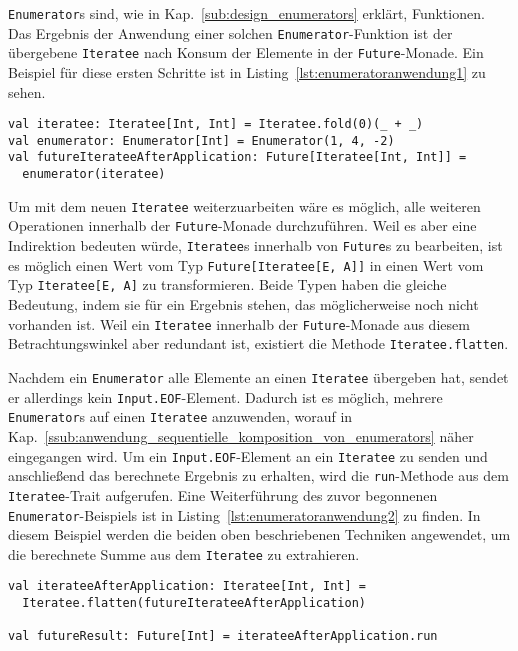 \lstinline|Enumerator|s sind, wie in Kap.~\ref{sub:design_enumerators} erklärt, Funktionen.
Das Ergebnis der Anwendung einer solchen \lstinline|Enumerator|-Funktion ist der übergebene \lstinline|Iteratee| nach Konsum der Elemente in der \lstinline|Future|-Monade.
Ein Beispiel für diese ersten Schritte ist in Listing~\ref{lst:enumeratoranwendung1} zu sehen.

\begin{lstlisting}[caption=Anwendung eines Enumerators auf einen Iteratee, label=lst:enumeratoranwendung1]
val iteratee: Iteratee[Int, Int] = Iteratee.fold(0)(_ + _)
val enumerator: Enumerator[Int] = Enumerator(1, 4, -2)
val futureIterateeAfterApplication: Future[Iteratee[Int, Int]] =
  enumerator(iteratee)
\end{lstlisting}


Um mit dem neuen \lstinline|Iteratee| weiterzuarbeiten wäre es möglich, alle weiteren Operationen innerhalb der \lstinline|Future|-Monade durchzuführen.
Weil es aber eine Indirektion bedeuten würde, \lstinline|Iteratee|s innerhalb von \lstinline|Future|s zu bearbeiten, ist es möglich einen Wert vom Typ \lstinline|Future[Iteratee[E, A]]| in einen Wert vom Typ \lstinline|Iteratee[E, A]| zu transformieren.
Beide Typen haben die gleiche Bedeutung, indem sie für ein Ergebnis stehen, das möglicherweise noch nicht vorhanden ist.
Weil ein \lstinline|Iteratee| innerhalb der \lstinline|Future|-Monade aus diesem Betrachtungswinkel aber redundant ist, existiert die Methode \lstinline|Iteratee.flatten|.


Nachdem ein \lstinline|Enumerator| alle Elemente an einen \lstinline|Iteratee| übergeben hat, sendet er allerdings kein \lstinline|Input.EOF|-Element.
Dadurch ist es möglich, mehrere \lstinline|Enumerator|s auf einen \lstinline|Iteratee| anzuwenden, worauf in Kap.~\ref{ssub:anwendung_sequentielle_komposition_von_enumerators} näher eingegangen wird.
Um ein \lstinline|Input.EOF|-Element an ein \lstinline|Iteratee| zu senden und anschließend das berechnete Ergebnis zu erhalten, wird die \lstinline|run|-Methode aus dem \lstinline|Iteratee|-Trait aufgerufen.
Eine Weiterführung des zuvor begonnenen \lstinline|Enumerator|-Beispiels ist in Listing~\ref{lst:enumeratoranwendung2} zu finden.
In diesem Beispiel werden die beiden oben beschriebenen Techniken angewendet, um die berechnete Summe aus dem \lstinline|Iteratee| zu extrahieren.

\begin{lstlisting}[caption=Extrahierung des Ergebnisses aus einem Iteratee, label=lst:enumeratoranwendung2]
val iterateeAfterApplication: Iteratee[Int, Int] =
  Iteratee.flatten(futureIterateeAfterApplication)

val futureResult: Future[Int] = iterateeAfterApplication.run
\end{lstlisting}

